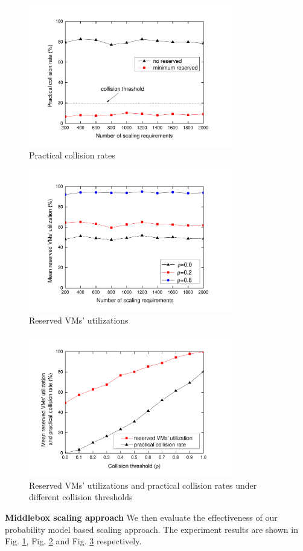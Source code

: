 \documentclass[review]{elsarticle}
\begin{document}
\begin{figure}
	\centering
	\includegraphics[width=3.5in]{fig/collision_rate_num.pdf}
	\caption{Practical collision rates}
	\label{fig:collision_rate_num}
\end{figure}
\begin{figure}
	\centering 
	\includegraphics[width=3.5in]{fig/vm_util_num_p.pdf}	
	\caption{Reserved VMs' utilizations}
	\label{fig:vm_util_num_p}
\end{figure}
\begin{figure}
	\centering
	\includegraphics[width=3.5in]{fig/vm_util_p.pdf}	
	\caption{Reserved VMs' utilizations
		and practical collision rates under different collision thresholds}
	\label{fig:vm_util_p}
\end{figure}
\textbf{Middlebox scaling approach}
We then evaluate the effectiveness of our probability model based scaling approach. The experiment results are shown in Fig. \ref{fig:collision_rate_num}, Fig. \ref{fig:vm_util_num_p} and Fig. \ref{fig:vm_util_p} respectively. 
\end{document}
